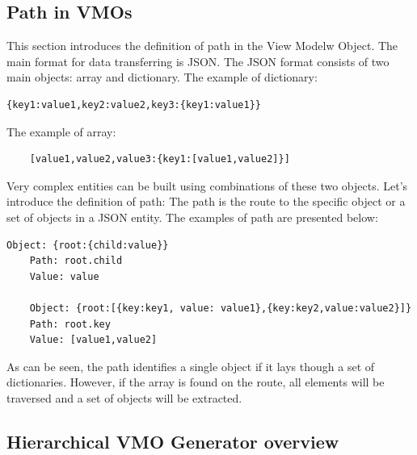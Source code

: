 

\subsection{Path in VMOs}

This section introduces the definition of path in the View Modelw Object. The main format for data transferring is JSON. The JSON format consists of two main objects: array and dictionary. The example of dictionary:

\lstset{ %
    caption=The example of JSON dictionary,
    basicstyle=\ttfamily\footnotesize\bfseries,
    linewidth=0.6\textwidth
 }
\begin{lstlisting}[linewidth=5cm]
	{key1:value1,key2:value2,key3:{key1:value1}}
\end{lstlisting}

 
The example of array: 

\lstset{ %
    caption=The example of JSON array,
    basicstyle=\ttfamily\footnotesize\bfseries,
    linewidth=0.6\textwidth
 }
\begin{lstlisting}
	[value1,value2,value3:{key1:[value1,value2]}]
\end{lstlisting}

Very complex entities can be built using combinations of these two objects. Let's introduce the definition of path: The path is the route to the specific object or a set of objects in a JSON entity. 
The examples of path are presented below:
\lstset{ %
    caption=The examples of objects in different routes,
    basicstyle=\ttfamily\footnotesize\bfseries,
    linewidth=0.6\textwidth
 }
\begin{lstlisting}[linewidth=5cm]
	Object: {root:{child:value}}
	Path: root.child
	Value: value

	Object: {root:[{key:key1, value: value1},{key:key2,value:value2}]}
	Path: root.key
	Value: [value1,value2]

\end{lstlisting}


As can be seen, the path identifies a single object if it lays though a set of dictionaries. However, if the array is found on the route, all elements will be traversed and a set of objects will be extracted. 


\subsection{Hierarchical VMO Generator overview}

